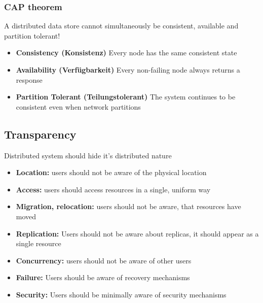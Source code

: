 \subsubsection{CAP theorem}
A distributed data store cannot simultaneously be consistent, available and partition tolerant!
\begin{itemize}
    \item \textbf{Consistency (Konsistenz)} Every node has the same consistent state
    \item \textbf{Availability (Verfügbarkeit)} Every non-failing node always returns a response
    \item \textbf{Partition Tolerant (Teilungstolerant)} The system continues to be consistent even when network partitions
\end{itemize}

\subsection{Transparency}
Distributed system should hide it's distributed nature
\begin{itemize}
    \item \textbf{Location:} users should not be aware of the physical location
    \item \textbf{Access:} users should access resources in a single, uniform way
    \item \textbf{Migration, relocation:} users should not be aware, that resources have moved
    \item \textbf{Replication:} Users should not be aware about replicas, it should appear as a single resource
    \item \textbf{Concurrency:} users should not be aware of other users
    \item \textbf{Failure:} Users should be aware of recovery mechanisms
    \item \textbf{Security:} Users should be minimally aware of security mechanisms
\end{itemize}

